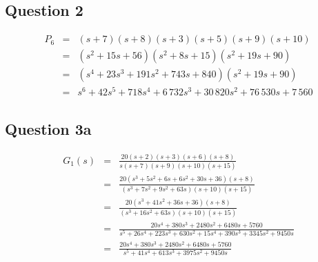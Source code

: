 \documentclass[12pt, a4paper]{article}
\begin{document}
		\subsection*{Question 2} %
		\label{sub:question_2}
			\begin{equation*}
				\begin{array}{rcl}
					P_6 & = & (s+7)(s+8)(s+3)(s+5)(s+9)(s+10) \\
					& = & (s^2+15s+56)(s^2+8s+15)(s^2+19s+90) \\
					& = & (s^4 + 23s^3 +191s^2+743s+840)(s^2+19s+90) \\
					& = & s^6 + 42s^5 +718s^4 + 6\,732s^3 + 30\,820s^2 + 76\,530s + 7\,560
				\end{array}
			\end{equation*}

		\subsection*{Question 3a}
		\label{sub:question_3a}
			\begin{equation*}
				\begin{array}{rcl}
					G_1(s) & = & \frac{20(s+2)(s+3)(s+6)(s+8)}{s(s+7)(s+9)(s+10)(s+15)}\\
					& = & \frac{20(s^3+5s^2+6s+6s^2+30s+36)(s+8)}{(s^3+7s^2+9s^2+63s)(s+10)(s+15)}\\
					& = & \frac{20(s^3+41s^2+36s+36)(s+8)}{(s^3+16s^2+63s)(s+10)(s+15)}\\
					& = & \frac{20s^4+380s^3+2480s^2+6480s+5760}{s^5+26s^4+223s^3+630s^2+15s^4+390s^3+3345s^2+9450s}\\
					& = & \frac{20s^4+380s^3+2480s^2+6480s+5760}{s^5+41s^4+613s^3+3975s^2+9450s}
				\end{array}
			\end{equation*} 
\end{document}
